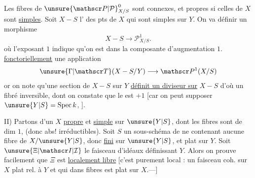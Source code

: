 Les fibres de ${\unsure{\mathscr P|\mathcal P}}^0_{X/S}$ sont connexes, et propres si celles de $X$ sont \uline{simples}. Soit  $X-S$ l’{} des pts de $X$ qui sont {} simples sur $Y$. On va définir un morphisme
\[
\boxed{X-S\longrightarrow\mathscr P^1_{X/S}}.
\]
où l’exposant $1$ indique qu’on est dans la composante d’augmentation $1$. {} {} \uline{fonctoriellement}  une application
\[
{\unsure{\Gamma|\mathscr T}}(X-S/Y)\longrightarrow\mathscr P^1(X/S)
\]
or on note qu’une section de $X-S$ sur $Y$ \uline{définit un diviseur sur} $X-S$ {} d’où un fibré inversible, dont on constate que le   est $+1$ [car on peut supposer ${\unsure{Y|S}}=\operatorname{Spec}k$, {}].

II) Partons d’un $X$ \uline{propre} et \uline{simple} sur ${\unsure{Y|S}}$, dont les fibres sont de dim $1$,  {} (donc abs! irréductibles). Soit $S$ un sous-schéma  de  ne contenant aucune fibre de $X/{\unsure{Y|S}}$, donc \uline{fini} sur ${\unsure{Y|S}}$, et plat sur $Y$. Soit ${\unsure{\Xi|\mathscr I|\mathcal I}}$ le faisceau d’idéaux définissant $Y$. Alors on prouve facilement que $\Xi$ est \uline{localement libre} [c’est purement local : un faisceau coh. sur $X$ plat rel. à $Y$ et qui {} dans fibres  est plat sur $X$.---]
